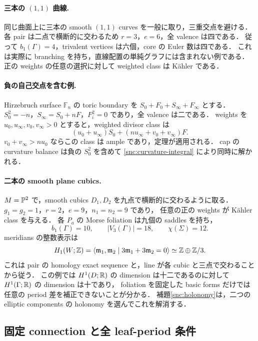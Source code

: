 \paragraph{三本の $(1,1)$ 曲線.}
同じ曲面上に三本の smooth $(1,1)$ curves を一般に取り，三重交点を避ける．
各 pair は二点で横断的に交わるため $r=3$，$e=6$，全 valence は四である．
従って $b_1(\Gamma)=4$，trivalent vertices は六個，core の Euler 数は四である．
これは実際に branching を持ち，直線配置の単純グラフには含まれない例である．
正の weights の任意の選択に対して weighted class は Kähler である．

\paragraph{負の自己交点を含む例.}
Hirzebruch surface $\mathbb F_n$ の toric boundary を
$S_0+F_0+S_\infty+F_\infty$ とする．
$S_0^2=-n$，$S_\infty=S_0+nF$，$F_i^2=0$ であり，全 valence は二である．
weights を $u_0,u_\infty,v_0,v_\infty>0$ とすると，weighted divisor class は
\[
 (u_0+u_\infty)S_0+(nu_\infty+v_0+v_\infty)F.
\]
$v_0+v_\infty>nu_0$ ならこの class は ample であり，定理が適用される．
cap の curvature balance は負の $S_0^2$ を含めて
\eqref{snc:curvature-integral} により同時に解かれる．


\paragraph{二本の smooth plane cubics.}
$M=\mathbb P^2$ で，smooth cubics $D_1,D_2$ を九点で横断的に交わるように取る．
$g_1=g_2=1$，$r=2$，$e=9$，$n_1=n_2=9$ であり，
任意の正の weights が Kähler class を与える．
各 $P_a$ の Morse foliation は九個の saddles を持ち，
\[
 b_1(\Gamma)=10,\qquad |V_3(\Gamma)|=18,\qquad \chi(\Sigma)=12.
\]
meridians の整数表示は
\[
 H_1(W;\mathbb Z)=\langle \mathfrak m_1,\mathfrak m_2\mid
          3\mathfrak m_1+3\mathfrak m_2=0\rangle
     \simeq\mathbb Z\oplus\mathbb Z/3.
\]
これは pair の homology exact sequence と，line が各 cubic と三点で交わることから従う．
この例では $H^1(D;\mathbb R)$ の dimension は十二であるのに対して
$H^1(\Gamma;\mathbb R)$ の dimension は十であり，
foliation を固定した basic forms だけでは任意の period 差を補正できないことが分かる．
補題\ref{snc:holonomy}は，二つの elliptic components の holonomy を選んでこれを解消する．

\subsection{固定 connection と全 leaf-period 条件}

